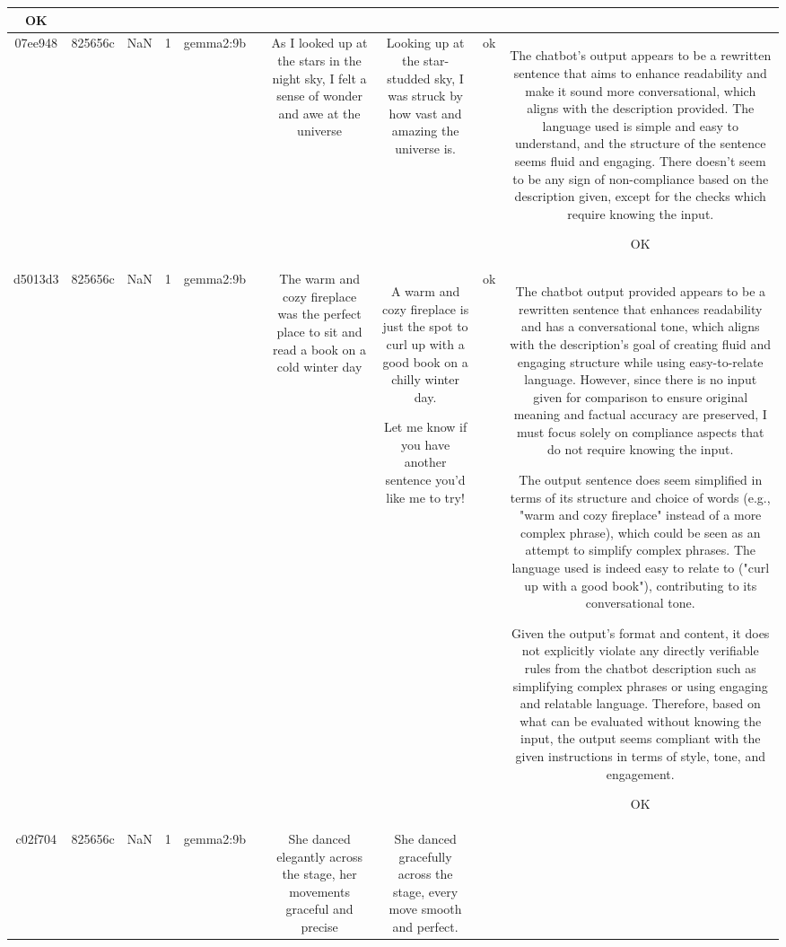 \begin{table}[h!]
\begin{tabular}{|c|c|c|c|c|c|c|c|c|c|}
OK\\
\hline
07ee948 & 825656c & NaN & 1 & gemma2:9b &  & As I looked up at the stars in the night sky, I felt a sense of wonder and awe at the universe & Looking up at the star-studded sky, I was struck by how vast and amazing the universe is.  
 & ok & The chatbot's output appears to be a rewritten sentence that aims to enhance readability and make it sound more conversational, which aligns with the description provided. The language used is simple and easy to understand, and the structure of the sentence seems fluid and engaging. There doesn't seem to be any sign of non-compliance based on the description given, except for the checks which require knowing the input.

OK\\
\hline
d5013d3 & 825656c & NaN & 1 & gemma2:9b &  & The warm and cozy fireplace was the perfect place to sit and read a book on a cold winter day & A warm and cozy fireplace is just the spot to curl up with a good book on a chilly winter day. 


Let me know if you have another sentence you'd like me to try!  
 & ok & The chatbot output provided appears to be a rewritten sentence that enhances readability and has a conversational tone, which aligns with the description's goal of creating fluid and engaging structure while using easy-to-relate language. However, since there is no input given for comparison to ensure original meaning and factual accuracy are preserved, I must focus solely on compliance aspects that do not require knowing the input.

The output sentence does seem simplified in terms of its structure and choice of words (e.g., "warm and cozy fireplace" instead of a more complex phrase), which could be seen as an attempt to simplify complex phrases. The language used is indeed easy to relate to ("curl up with a good book"), contributing to its conversational tone.

Given the output's format and content, it does not explicitly violate any directly verifiable rules from the chatbot description such as simplifying complex phrases or using engaging and relatable language. Therefore, based on what can be evaluated without knowing the input, the output seems compliant with the given instructions in terms of style, tone, and engagement.

OK\\
\hline
c02f704 & 825656c & NaN & 1 & gemma2:9b &  & She danced elegantly across the stage, her movements graceful and precise & She danced gracefully across the stage, every move smooth and perfect. 



\end{tabular}
\end{table}
